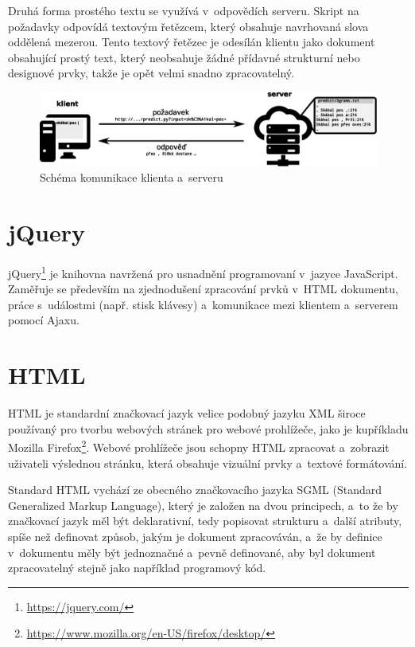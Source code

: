 \documentclass[a4paper,11pt,openany]{book} %
\begin{document}
Druhá forma prostého textu se využívá v~odpovědích serveru. Skript na požadavky odpovídá textovým řetězcem, který obsahuje navrhovaná slova oddělená mezerou. Tento textový řetězec je odesílán klientu jako dokument obsahující prostý text, který neobsahuje žádné přídavné strukturní nebo designové prvky, takže je opět velmi snadno zpracovatelný.

\begin{figure}[h]
	\centering
	\includegraphics[width=1.0\textwidth]{client-server-schema1.eps}
	\caption{Schéma komunikace klienta a~serveru\protect\footnotemark}
	\label{fig:clientserver}
\end{figure}


\section{jQuery}

jQuery\footnote{\url{https://jquery.com/}} je knihovna navržená pro usnadnění programovaní v~jazyce JavaScript. Zaměřuje se především na zjednodušení zpracování prvků v~HTML dokumentu, práce s~událostmi (např. stisk klávesy) a~komunikace mezi klientem a~serverem pomocí Ajaxu.

\section{HTML}

HTML je standardní značkovací jazyk velice podobný jazyku XML široce používaný pro tvorbu webových stránek pro webové prohlížeče, jako je kupříkladu Mozilla Firefox\footnote{\url{https://www.mozilla.org/en-US/firefox/desktop/}}. Webové prohlížeče jsou schopny HTML zpracovat a~zobrazit uživateli výslednou stránku, která obsahuje vizuální prvky a~textové formátování. \parencite[19--22]{raggett1999html}

Standard HTML vychází ze obecného značkovacího jazyka SGML (Standard Generalized Markup Language), který je založen na dvou principech, a~to že by značkovací jazyk měl být deklarativní, tedy popisovat strukturu a~další atributy, spíše než definovat způsob, jakým je dokument zpracováván, a~že by definice v~dokumentu měly být jednoznačné a~pevně definované, aby byl dokument zpracovatelný stejně jako například programový kód. \parencite{rubinsky1990sgml} %
\end{document}
